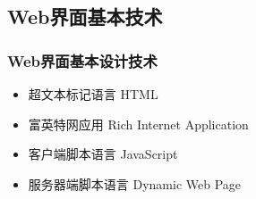 \documentclass{beamer}
\newcommand{\fullPageImage}[2]{
	{
		\usebackgroundtemplate{\texttt{[image: \#1]}}
		\frame[plain]{#2}
	}
}
\begin{document}
%
%
%
%

\subsection{Web界面基本技术}
\fullPageImage{images/abbreviation-overload.png}{}

\begin{frame}
	\frametitle{Web界面基本设计技术}
	\beamertemplatetransparentcovereddynamicmedium
	\begin{itemize}[<+->]
		\item 超文本标记语言 HTML
		\item 富英特网应用 Rich Internet Application 
		\item 客户端脚本语言 JavaScript 
		\item 服务器端脚本语言 Dynamic Web Page
	\end{itemize}
\end{frame}
\end{document}
